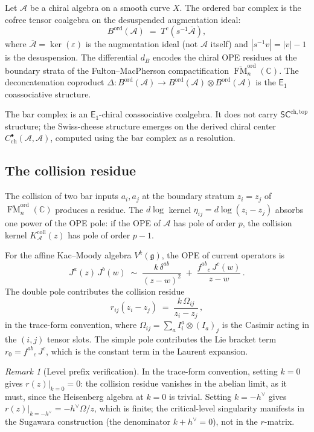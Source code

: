 \documentclass[11pt,reqno]{amsart}
\theoremstyle{definition}
\theoremstyle{remark}
\newtheorem{remark}[theorem]{Remark}
\newcommand{\cA}{\mathcal{A}}
\newcommand{\Eone}{\mathsf{E}_{1}}
\DeclareMathOperator{\FM}{FM}
\newcommand{\fg}{\mathfrak{g}}
\newcommand{\CC}{\mathbb{C}}
\newcommand{\hv}{h^{\vee}}
\newcommand{\kp}{k + h^{\vee}}
\numberwithin{equation}{section}
\begin{document}
Let $\cA$ be a chiral algebra on a smooth curve $X$.  The
ordered bar complex is the cofree tensor coalgebra on the
desuspended augmentation ideal:
\begin{equation}\label{eq:dk-bar}
B^{\mathrm{ord}}(\cA)
\;=\;
T^c(s^{-1}\bar{\cA}),
\end{equation}
where $\bar{\cA} = \ker(\varepsilon)$ is the augmentation
ideal (not $\cA$ itself) and
$|s^{-1}v| = |v| - 1$ is the desuspension.
The differential $d_B$ encodes the chiral OPE residues at
the boundary strata of the Fulton--MacPherson
compactification
$\overline{\FM}_n^{\mathrm{ord}}(\CC)$.  The
deconcatenation coproduct
$\Delta \colon B^{\mathrm{ord}}(\cA) \to
B^{\mathrm{ord}}(\cA) \otimes B^{\mathrm{ord}}(\cA)$
is the $\Eone$ coassociative structure.

The bar complex is an $\Eone$-chiral coassociative
coalgebra.  It does not carry
$\mathsf{SC}^{\mathrm{ch,top}}$ structure; the
Swiss-cheese structure emerges on the derived chiral center
$C^\bullet_{\mathrm{ch}}(\cA, \cA)$, computed using the
bar complex as a resolution.

\subsection{The collision residue}

The collision of two bar inputs $a_i, a_j$ at the boundary
stratum $z_i = z_j$ of $\overline{\FM}_n^{\mathrm{ord}}(\CC)$
produces a residue.  The $d\log$ kernel
$\eta_{ij} = d\log(z_i - z_j)$ absorbs one power of the
OPE pole: if the OPE of $\cA$ has pole of order $p$, the
collision kernel $K_\cA^{\mathrm{coll}}(z)$ has pole of order $p - 1$.

For the affine Kac--Moody algebra $V^k(\fg)$, the OPE of
current operators is
\[
J^a(z)\,J^b(w)
\;\sim\;
\frac{k\,\delta^{ab}}{(z-w)^2}
\;+\;
\frac{f^{ab}{}_c\,J^c(w)}{z-w}\,.
\]
The double pole contributes the collision residue
\begin{equation}\label{eq:dk-collision-residue}
r_{ij}(z_i - z_j)
\;=\;
\frac{k\,\Omega_{ij}}{z_i - z_j}\,,
\end{equation}
in the trace-form convention, where
$\Omega_{ij} = \sum_a I^a_i \otimes (I_a)_j$ is the Casimir
acting in the $(i,j)$ tensor slots.  The simple pole
contributes the Lie bracket term
$r_0 = f^{ab}{}_c\,J^c$, which is the constant term in
the Laurent expansion.

\begin{remark}[Level prefix verification]
In the trace-form convention, setting $k = 0$ gives
$r(z)|_{k=0} = 0$: the collision residue vanishes in the
abelian limit, as it must, since the Heisenberg algebra at
$k = 0$ is trivial.  Setting $k = -\hv$ gives
$r(z)|_{k=-\hv} = -\hv\Omega/z$, which is finite; the
critical-level singularity manifests in the Sugawara
construction (the denominator $\kp = 0$), not in the
$r$-matrix.
\end{remark}
\end{document}
